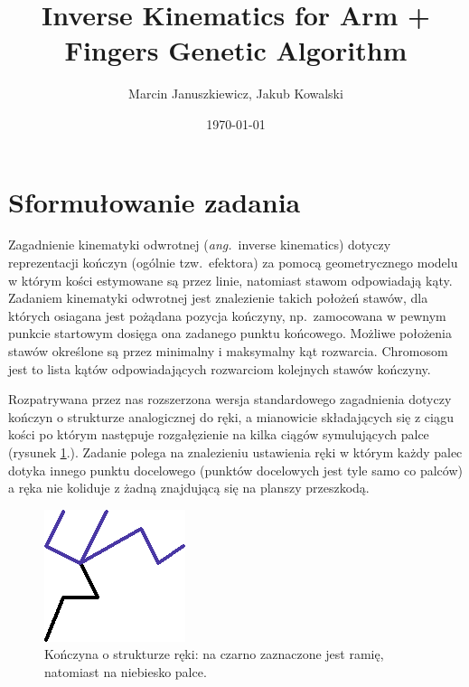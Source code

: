 \documentclass[11pt, leqno]{article}
\title{Inverse Kinematics for Arm + Fingers Genetic Algorithm}
\date{\today}
\author{Marcin Januszkiewicz, Jakub Kowalski}
\begin{document}
\maketitle
\vspace{17em}
\tableofcontents
\newpage

\section{Sformułowanie zadania}
Zagadnienie kinematyki odwrotnej (\textit{ang.}\ inverse kinematics) dotyczy reprezentacji kończyn (ogólnie tzw.\ efektora) za pomocą geometrycznego modelu w którym kości estymowane są przez linie, natomiast stawom odpowiadają kąty. Zadaniem kinematyki odwrotnej jest znalezienie takich położeń stawów, dla których osiagana jest pożądana pozycja kończyny, np.\ zamocowana w pewnym punkcie startowym dosięga ona zadanego punktu końcowego. Możliwe położenia stawów określone są przez minimalny i maksymalny kąt rozwarcia. Chromosom jest to lista kątów odpowiadających rozwarciom kolejnych stawów kończyny.

Rozpatrywana przez nas rozszerzona wersja standardowego zagadnienia dotyczy kończyn o strukturze analogicznej do ręki, a mianowicie składających się z ciągu kości po którym następuje rozgałęzienie na kilka ciągów symulujących palce (rysunek \ref{fig:armf}.). Zadanie polega na znalezieniu ustawienia ręki w którym każdy palec dotyka innego punktu docelowego (punktów docelowych jest tyle samo co palców) a ręka nie koliduje z żadną znajdującą się na planszy przeszkodą.

\begin{figure}[h!]
	\centering
	\includegraphics[scale=0.5]{armfingers}
	\caption{Kończyna o strukturze ręki: na czarno zaznaczone jest ramię, natomiast na niebiesko palce.}
	\label{fig:armf}
\end{figure}
\end{document}
